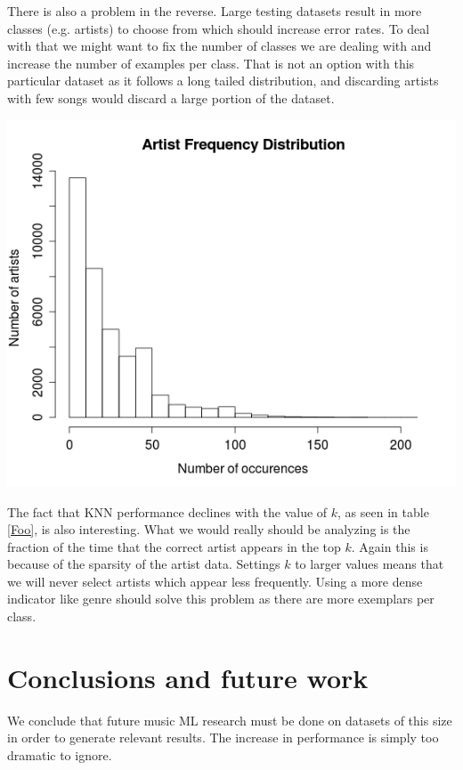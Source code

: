 \documentclass[a4paper,10pt]{article}
\begin{document}
There is also a problem in the reverse. Large testing datasets result in more classes (e.g. artists) to choose from which should increase error rates. To deal with that we might want to fix the number of classes we are dealing with and increase the number of examples per class. That is not an option with this particular dataset as it follows a long tailed distribution, and discarding artists with few songs would discard a large portion of the dataset.

\begin{center}
 \includegraphics[scale=0.4,keepaspectratio=true]{./artist_frequency_dist.png}
\end{center}

The fact that KNN performance declines with the value of $k$, as seen in table \ref{Foo}, is also interesting. What we would really should be analyzing is the fraction of the time that the correct artist appears in the top $k$. Again this is because of the sparsity of the artist data. Settings $k$ to larger values means that we will never select artists which appear less frequently. Using a more dense indicator like genre should solve this problem as there are more exemplars per class.

\section{Conclusions and future work}
We conclude that future music ML research must be done on datasets of this size in order to generate relevant results. The increase in performance is simply too dramatic to ignore.
\end{document}
